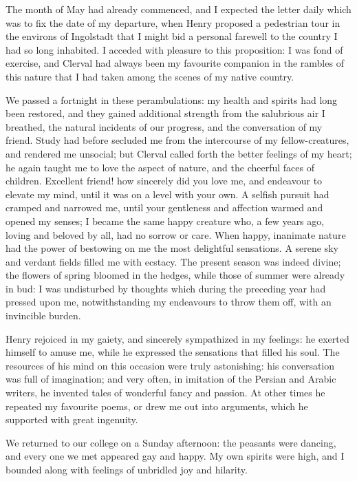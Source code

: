 The month of May had already commenced,
and I expected the letter daily
which was to fix the date of my departure,
when Henry proposed a pedestrian
tour in the environs of Ingolstadt that
I might bid a personal farewell to the
country I had so long inhabited. I acceded
with pleasure to this proposition:
I was fond of exercise, and Clerval had
always been my favourite companion in
the rambles of this nature that I had
taken among the scenes of my native
country.

We passed a fortnight in these perambulations:
my health and spirits
had long been restored, and they gained
additional strength from the salubrious
air I br\-eath\-ed, the natural incidents of
our progress, and the conversation of
my friend. Study had before secluded
me from the intercourse of my fellow-creatures,
and rendered me unsocial;
but Clerval called forth the better feelings
of my heart; he again taught me
to love the aspect of nature, and the
cheerful faces of children. Excellent
friend! how sincerely did you love me,
and endeavour to elevate my mind,
until it was on a level with your own.
A selfish pursuit had cramped and narrowed
me, until your gentleness and
affection warmed and opened my senses;
I became the same happy creature who,
a few years ago, loving and beloved by
all, had no sorrow or care. When
happy, inanimate nature had the power
of bestowing on me the most delightful
sensations. A serene sky and verdant
fields filled me with ecstacy. The
present season was indeed divine; the
flowers of spring bloomed in the hedges,
while those of summer were already in
bud: I was undisturbed by thoughts
which during the preceding year had
pressed upon me, notwithstanding my
endeavours to throw them off, with an
invincible burden.

Henry rejoiced in my gaiety, and
sincerely sympathized in my feelings:
he exerted himself to amuse me, while
he expressed the sensations that filled
his soul. The resources of his mind
on this occasion were truly astonishing:
his conversation was full of imagination;
and very often, in imitation
of the Persian and Arabic writers, he
invented tales of wonderful fancy and
passion. At other times he repeated
my favourite poems, or drew me out
into arguments, which he supported
with great ingenuity.

We returned to our college on a
Sunday afternoon: the peasants were
dancing, and every one we met appeared
gay and happy. My own spirits
were high, and I bounded along
with feelings of unbridled joy and
hilarity.

